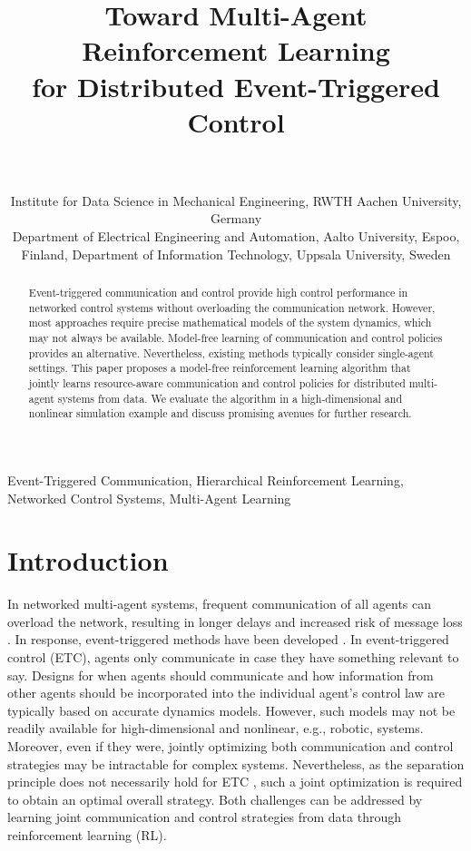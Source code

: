 \documentclass[12pt, final]{l4dc2023}
\title[Multi-Agent Reinforcement Learning for Distributed Event-Triggered Control]{Toward Multi-Agent Reinforcement Learning\\ for Distributed Event-Triggered Control}
\author{%
 {\Name{Lukas Kesper} \Email{lukas.kesper@rwth-aachen.de}\\
  \Name{Sebastian Trimpe} \Email{trimpe@dsme.rwth-aachen.de}\\
  \addr Institute for Data Science in Mechanical Engineering, \newline
    RWTH Aachen University, Germany}
 \AND
 \Name{Dominik Baumann} \Email{dominik.baumann@aalto.fi}\\
 \addr Department of Electrical Engineering and Automation, \newline 
 Aalto University, Espoo, Finland, \newline
 Department of Information Technology, \newline
 Uppsala University, Sweden%
}
\begin{document}
\maketitle


\begin{abstract}
Event-triggered communication and control provide high control performance in networked control systems without overloading the communication network.
However, most approaches require precise mathematical models of the system dynamics, which may not always be available.
Model-free learning of communication and control policies provides an alternative. Nevertheless, existing methods typically consider single-agent settings.
This paper proposes a model-free reinforcement learning algorithm that jointly learns resource-aware communication and control policies for distributed multi-agent systems from data.
We evaluate the algorithm in a high-dimensional and nonlinear simulation example and discuss promising avenues for further research.
\end{abstract}

\begin{keywords}%
  Event-Triggered Communication, Hierarchical Reinforcement Learning, Networked Control Systems, Multi-Agent Learning
\end{keywords}

\thispagestyle{fancy}   %
\pagestyle{empty}

\section{Introduction}

In networked multi-agent systems, frequent communication of all agents can overload the network, resulting in longer delays and increased risk of message loss \citep{hespanha2007survey}. 
In response, event-triggered methods have been developed \citep{heemels2012introduction,grune14event,miskowicz15event}. 
In event-triggered control (ETC), agents only communicate in case they have something relevant to say. 
Designs for when agents should communicate and how information from other agents should be incorporated into the individual agent's control law are typically based on accurate dynamics models. 
However, such models may not be readily available for high-dimensional and nonlinear, e.g., robotic, systems. 
Moreover, even if they were, jointly optimizing both communication and control strategies may be intractable for complex systems.
Nevertheless, as the separation principle does not necessarily hold for ETC \citep{ramesh2011dual}, such a joint optimization is required to obtain an optimal overall strategy.
Both challenges can be addressed by learning joint communication and control strategies from data through reinforcement learning (RL).
\end{document}
